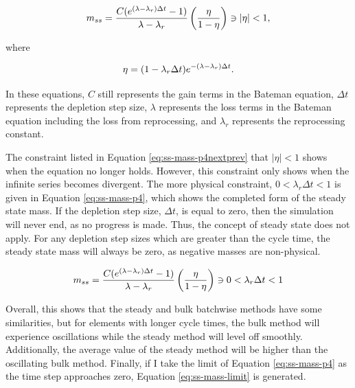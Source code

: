 \begin{equation} \hfill 
m_{ss} =  \frac{C (e^{(\lambda - \lambda_r) \Delta t} - 1)}{\lambda - \lambda_r}  \left( \frac{\eta}{1 - \eta} \right) \ni \left|\eta \right| < 1,
\hfill\label{eq:ss-mass-p4nextprev} \end{equation}

where

\begin{equation} \hfill 
\eta = (1 - \lambda_r \Delta t) e^{-(\lambda - \lambda_r) \Delta t}.
\hfill\label{eq:ss-mass-p4next-simple} \end{equation}

In these equations, $C$ still represents the gain terms in the Bateman equation, $\Delta t$ represents the depletion step size, $\lambda$ represents the loss terms in the Bateman equation including the loss from reprocessing, and $\lambda_r$ represents the reprocessing constant.

The constraint listed in Equation \eqref{eq:ss-mass-p4nextprev} that $\left|\eta \right| < 1$ shows when the equation no longer holds. However, this constraint only shows when the infinite series becomes divergent. The more physical constraint, $0 < \lambda_r \Delta t < 1$ is given in Equation \eqref{eq:ss-mass-p4}, which shows the completed form of the steady state mass. If the depletion step size, $\Delta t$, is equal to zero, then the simulation will never end, as no progress is made. Thus, the concept of steady state does not apply. For any depletion step sizes which are greater than the cycle time, the steady state mass will always be zero, as negative masses are non-physical.

\begin{equation} \hfill 
m_{ss} = \frac{C (e^{(\lambda - \lambda_r) \Delta t} - 1)}{\lambda - \lambda_r}  \left( \frac{\eta}{1 - \eta} \right) \ni 0 < \lambda_r \Delta t < 1
\hfill\label{eq:ss-mass-p4} \end{equation}



Overall, this shows that the steady and bulk batchwise methods have some similarities, but for elements with longer cycle times, the bulk method will experience oscillations while the steady method will level off smoothly. Additionally, the average value of the steady method will be higher than the oscillating bulk method. Finally, if I take the limit of Equation \eqref{eq:ss-mass-p4} as the time step approaches zero, Equation \eqref{eq:ss-mass-limit} is generated.

